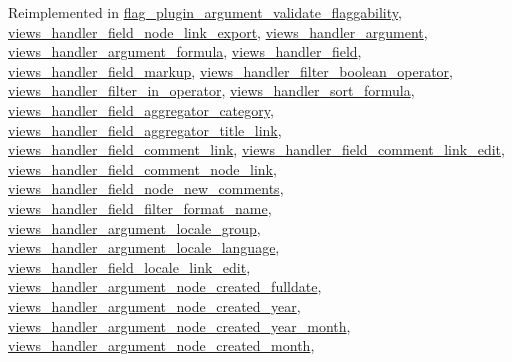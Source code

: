 Reimplemented in \hyperlink{classflag__plugin__argument__validate__flaggability_6eb16f6ded91625eb61ea1af4ac22e9d}{flag\_\-plugin\_\-argument\_\-validate\_\-flaggability}, \hyperlink{classviews__handler__field__node__link__export_1ccad9b1e274a9345a3f167a58e7f997}{views\_\-handler\_\-field\_\-node\_\-link\_\-export}, \hyperlink{classviews__handler__argument_93594a31e95e1a14cead4f038d7b321b}{views\_\-handler\_\-argument}, \hyperlink{classviews__handler__argument__formula_01284402427de2bcfa1b1da5792a2332}{views\_\-handler\_\-argument\_\-formula}, \hyperlink{classviews__handler__field_3d50050864c255b71c842972a45d39f6}{views\_\-handler\_\-field}, \hyperlink{classviews__handler__field__markup_ddc5d6e6130133c1d65d8b96dce502a5}{views\_\-handler\_\-field\_\-markup}, \hyperlink{classviews__handler__filter__boolean__operator_659352df10ef3144359e90247f450ef2}{views\_\-handler\_\-filter\_\-boolean\_\-operator}, \hyperlink{classviews__handler__filter__in__operator_1ec0f531f2c590ef15468ae06c5d0284}{views\_\-handler\_\-filter\_\-in\_\-operator}, \hyperlink{classviews__handler__sort__formula_19d1b335b939c45903815256b5a6e0b8}{views\_\-handler\_\-sort\_\-formula}, \hyperlink{classviews__handler__field__aggregator__category_d85fc06aa0e07281e3989dee8bd0c975}{views\_\-handler\_\-field\_\-aggregator\_\-category}, \hyperlink{classviews__handler__field__aggregator__title__link_bcde91e341b70cc842fec304c7de8376}{views\_\-handler\_\-field\_\-aggregator\_\-title\_\-link}, \hyperlink{classviews__handler__field__comment__link_11c7fcae5ff5f91fa48fc1581115869b}{views\_\-handler\_\-field\_\-comment\_\-link}, \hyperlink{classviews__handler__field__comment__link__edit_b18ca319bec910ab7771786522718d0e}{views\_\-handler\_\-field\_\-comment\_\-link\_\-edit}, \hyperlink{classviews__handler__field__comment__node__link_6a8823310c2ef5c3a70e6a394e45e699}{views\_\-handler\_\-field\_\-comment\_\-node\_\-link}, \hyperlink{classviews__handler__field__node__new__comments_a496a5184a390c29a60e0dc7d16c23e5}{views\_\-handler\_\-field\_\-node\_\-new\_\-comments}, \hyperlink{classviews__handler__field__filter__format__name_eacc272fd36677b2d56063a578e23d3a}{views\_\-handler\_\-field\_\-filter\_\-format\_\-name}, \hyperlink{classviews__handler__argument__locale__group_5dd96da33f67166727c6af6547ccbb7a}{views\_\-handler\_\-argument\_\-locale\_\-group}, \hyperlink{classviews__handler__argument__locale__language_de5af4ea7ada57c6716a6712bbc767c5}{views\_\-handler\_\-argument\_\-locale\_\-language}, \hyperlink{classviews__handler__field__locale__link__edit_6f7db94c0dc07564c1853fd7ef153a6e}{views\_\-handler\_\-field\_\-locale\_\-link\_\-edit}, \hyperlink{classviews__handler__argument__node__created__fulldate_f5b74c0204c9da9285cbe3e07ebed345}{views\_\-handler\_\-argument\_\-node\_\-created\_\-fulldate}, \hyperlink{classviews__handler__argument__node__created__year_a40b34ab0d297264f7378fc995e06bc7}{views\_\-handler\_\-argument\_\-node\_\-created\_\-year}, \hyperlink{classviews__handler__argument__node__created__year__month_9e090c0caf0a169fe3f9a78160896d01}{views\_\-handler\_\-argument\_\-node\_\-created\_\-year\_\-month}, \hyperlink{classviews__handler__argument__node__created__month_0f9b4da1f37a58ca3e416667dc8d9bbb}{views\_\-handler\_\-argument\_\-node\_\-created\_\-month}, 